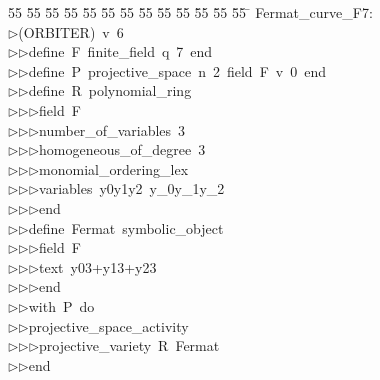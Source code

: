 %
%
\begin{tabbing}
55 \= 55 \= 55 \= 55 \= 55 \= 55 \= 55 \= 55 \= 55 \= 55 \= 55 \= 55 \= 55 \= \kill
Fermat\_curve\_F7:\\[0pt]
$\triangleright$\>(ORBITER)\ v\ 6\ \\[0pt]
$\triangleright$\>$\triangleright$\>define\ F\ finite\_field\ q\ 7\ end\ \\[0pt]
$\triangleright$\>$\triangleright$\>define\ P\ projective\_space\ n\ 2\ field\ F\ v\ 0\ end\ \\[0pt]
$\triangleright$\>$\triangleright$\>define\ R\ polynomial\_ring\ \\[0pt]
$\triangleright$\>$\triangleright$\>$\triangleright$\>field\ F\ \\[0pt]
$\triangleright$\>$\triangleright$\>$\triangleright$\>number\_of\_variables\ 3\ \\[0pt]
$\triangleright$\>$\triangleright$\>$\triangleright$\>homogeneous\_of\_degree\ 3\ \\[0pt]
$\triangleright$\>$\triangleright$\>$\triangleright$\>monomial\_ordering\_lex\ \\[0pt]
$\triangleright$\>$\triangleright$\>$\triangleright$\>variables\ y0y1y2\ y\_0y\_1y\_2\ \\[0pt]
$\triangleright$\>$\triangleright$\>$\triangleright$\>end\ \\[0pt]
$\triangleright$\>$\triangleright$\>define\ Fermat\ symbolic\_object\ \\[0pt]
$\triangleright$\>$\triangleright$\>$\triangleright$\>field\ F\ \\[0pt]
$\triangleright$\>$\triangleright$\>$\triangleright$\>text\ y03+y13+y23\ \\[0pt]
$\triangleright$\>$\triangleright$\>$\triangleright$\>end\ \\[0pt]
$\triangleright$\>$\triangleright$\>with\ P\ do\ \\[0pt]
$\triangleright$\>$\triangleright$\>projective\_space\_activity\ \\[0pt]
$\triangleright$\>$\triangleright$\>$\triangleright$\>projective\_variety\ R\ Fermat\ \ \\[0pt]
$\triangleright$\>$\triangleright$\>end\\[0pt]
\end{tabbing}
